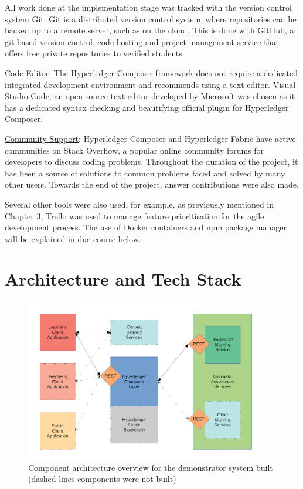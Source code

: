 All work done at the implementation stage was tracked with the version control system Git. 
Git is a distributed version control system, where repositories can be backed up to a remote server, 
such as on the cloud. This is done with GitHub, a git-based version control, code hosting and 
project management service that offers free private repositories to verified students \citep{github2018education}.

\underline{Code Editor}: The Hyperledger Composer framework does not require a dedicated integrated 
development environment and recommends using a text editor. Visual Studio Code, an open source text editor developed 
by Microsoft was chosen as it has a dedicated syntax checking and beautifying official plugin for Hyperledger Composer.

\underline{Community Support}: Hyperledger Composer and Hyperledger Fabric have active communities on Stack Overflow, 
a popular online community forums for developers to discuss coding problems. Throughout the duration of the project, 
it has been a source of solutions to common problems faced and solved by many other users. Towards the end of the project, 
answer contributions were also made.

Several other tools were also used, for example, as previously mentioned in Chapter 3, Trello was used to manage 
feature prioritisation for the agile development process. The use of Docker containers and npm package manager 
will be explained in due course below.

\section{Architecture and Tech Stack}

\begin{figure}[!ht] 
    \centering    
    \includegraphics[width=0.9\textwidth]{architecture}
    \caption[Demonstrator Component Architecture]
        {Component architecture overview for the demonstrator system built (dashed lines components were not built)}
    \label{fig:architecture}
\end{figure} 

